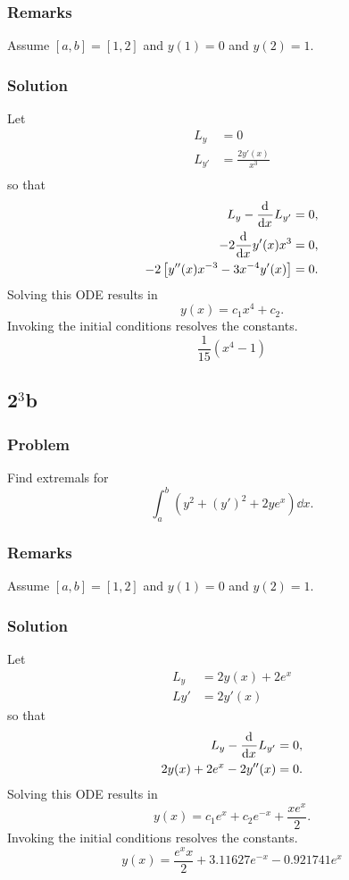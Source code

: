 \documentclass[12pt,twoside]{article}
\begin{document}
\subsubsection*{Remarks}
Assume $[a,b]=[1,2]$ and $y(1)=0$ and $y(2)=1$.

\subsubsection*{Solution}
Let
\begin{align*}
  L_y &= 0 \\
  L_{y'} &= \frac{2y'(x)}{x^3} \\
\end{align*}
so that
\begin{align*}
  L_y - \frac{\mathrm{d}^{} {}}{\mathrm{d}{x}^{}} L_{y'} &= 0, \\
  -2 \frac{\mathrm{d}^{} {}}{\mathrm{d}{x}^{}} y'(x) x^3 &= 0, \\
  -2\left[ y''(x) x^{-3}-3x^{-4}y'(x) \right] &= 0.
\end{align*}
Solving this ODE results in
\begin{equation*}
  y(x)=c_1x^4+c_2.
\end{equation*}
Invoking the initial conditions resolves the constants.
\begin{equation*}
  \boxed{\frac{1}{15}(x^4-1)}
\end{equation*}

\subsection{2$^3$b}
\subsubsection*{Problem}
Find extremals for
\begin{equation}
  \label{eq:4.3.2b-problem}
  \int_a^b(y^2+{(y')}^2 + 2ye^x)\dd{x}.
\end{equation}

\subsubsection*{Remarks}
Assume $[a,b]=[1,2]$ and $y(1)=0$ and $y(2)=1$.
\subsubsection*{Solution}
Let
\begin{align*}
  L_y &= 2y(x)+2e^x \\
  L{y'} &= 2y'(x)
\end{align*}
so that
\begin{align*}
  L_y - \frac{\mathrm{d}^{} {}}{\mathrm{d}{x}^{}} L_{y'} &= 0, \\
  2y(x) + 2e^x - 2y''(x) &= 0. \\
\end{align*}
Solving this ODE results in
\begin{equation*}
  y(x) = c_1 e^x + c_2 e^{-x} + \frac{x e^x}{2}.
\end{equation*}
Invoking the initial conditions resolves the constants.
\begin{equation*}
  \boxed{y(x) = \frac{e^x x}{2}+3.11627 e^{-x}-0.921741 e^x}
\end{equation*}
\end{document}
